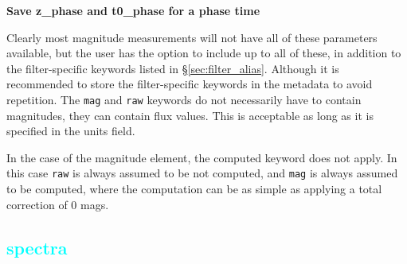\documentclass[tighten]{aastex631}
\newcommand{\property}[1]{\textcolor{cyan}{#1}}
\begin{document}
\textbf{Save z_phase and t0_phase for a phase time}

Clearly most magnitude measurements will not have all of these parameters available, but the user has the option to include up to all of these, in addition to the filter-specific keywords listed in \S\ref{sec:filter_alias}. Although it is recommended to store the filter-specific keywords in the metadata to avoid repetition. The {\tt mag} and {\tt raw} keywords do not necessarily have to contain magnitudes, they can contain flux values. This is acceptable as long as it is specified in the units field.

In the case of the magnitude element, the computed keyword does not apply. In this case {\tt raw} is always assumed to be not computed, and {\tt mag} is always assumed to be computed, where the computation can be as simple as applying a total correction of 0 mags.

\subsection{\property{spectra}} \label{sec:spectra}
\end{document}
